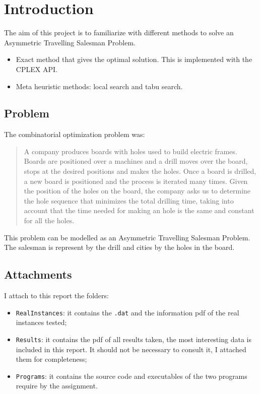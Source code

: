 \section{Introduction}
	The aim of this project is to familiarize with different methods to solve an Asymmetric Travelling Salesman Problem.
	\begin{itemize}
		\item Exact method that gives the optimal solution. This is implemented with the CPLEX API.
		\item Meta heuristic methods: local search and tabu search.
	\end{itemize}

	\subsection{Problem}
		The combinatorial optimization problem was:
		\begin{quote}
				A company produces boards with holes used to build electric frames.  Boards are positioned over a machines and a drill moves over the board, stops at the desired positions and makes the holes.  Once a board is drilled, a new board is positioned and the process is iterated many times.  Given the position of the holes on the board, the company asks us to determine the hole sequence that minimizes the total drilling time, taking into account that the time needed for making an hole is the same and constant for all the holes.
		\end{quote}
	
		This problem can be modelled as an Asymmetric Travelling Salesman Problem. The salesman is represent by the drill and cities by the holes in the board.
		
	\subsection{Attachments}
		I attach to this report the folders:
		\begin{itemize}
			\item \verb|RealInstances|: it contains the \verb|.dat| and the information pdf of the real instances tested;
			\item \verb|Results|: it contains the pdf of all results taken, the most interesting data is included in this report. It should not be necessary to consult it, I attached them for completeness;
			\item \verb|Programs|: it contains the source code and executables of the two programs require by the assignment.
		\end{itemize}
	
